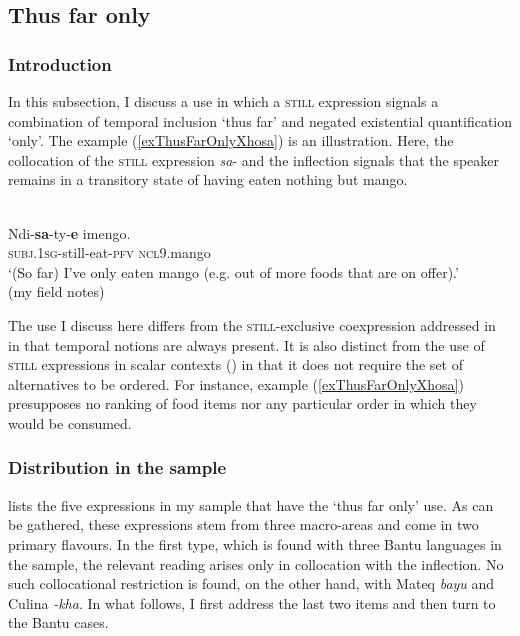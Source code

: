 \subsection{Thus far only}\label{sectionThusFarOnly}
\subsubsection{Introduction} In this subsection, I discuss a use in which a \textsc{still} expression signals a combination of temporal inclusion \lq thus far\rq{ }and negated existential quantification \lq only\rq{}. The  example (\ref{exThusFarOnlyXhosa}) is an illustration. Here, the collocation of the \textsc{still} expression \mbox{\textit{sa}-} and the   inflection signals that the speaker remains in a transitory state of having eaten nothing but mango.

\begin{exe}
	\ex {}\label{exThusFarOnlyXhosa}\\
	\gll Ndi-\textbf{sa}-ty-\textbf{e} imengo.\\
	\textsc{subj}.1\textsc{sg}-still-eat-\textsc{pfv} \textsc{ncl}9.mango\\
	\glt \lq (So far) I've only eaten mango (e.g. out of more foods that are on offer).'
	\\(my field notes)
\end{exe} 

The use I discuss here differs from the \textsc{still}-exclusive coexpression addressed in  in that temporal notions are always present. It is also distinct from the use of \textsc{still} expressions in scalar contexts () in that it does not require the set of alternatives to be ordered. For instance, example (\ref{exThusFarOnlyXhosa}) presupposes no ranking of food items nor any particular order in which they would be consumed.

\subsubsection{Distribution in the sample} 
 lists the five expressions in my sample that have the \lq thus far only\rq{ }use. As can be gathered, these expressions stem from three macro-areas and come in two primary flavours. In the first type, which is found with three Bantu languages in the sample, the relevant reading arises only in collocation with the   inflection. No such collocational restriction is found, on the other hand, with Mateq \textit{bayu} and Culina \textit{-\textit{kha}}. In what follows, I first address the last two items and then turn to the Bantu cases.

